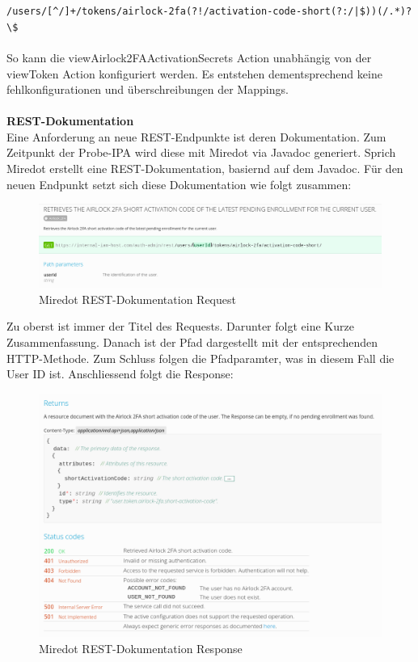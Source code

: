 \noindent \verb @/users/[^/]+/tokens/airlock-2fa(?!/activation-code-short(?:/|$))(/.*)?\$ @\\\\
So kann die viewAirlock2FAActivationSecrets Action unabhängig von der viewToken Action konfiguriert werden. Es entstehen dementsprechend keine fehlkonfigurationen und überschreibungen der Mappings.\\
\\
\textbf{REST-Dokumentation}\\
Eine Anforderung an neue REST-Endpunkte ist deren Dokumentation. Zum Zeitpunkt der Probe-IPA wird diese mit Miredot via Javadoc generiert. Sprich Miredot erstellt eine REST-Dokumentation, basiernd auf dem Javadoc. Für den neuen Endpunkt setzt sich diese Dokumentation wie folgt zusammen:
\begin{figure}[H]
	\begin{center}
		\includegraphics[width=1.0\textwidth]{ressourcen/requestdoc}
		\caption[REST-Dokumentation Request]{Miredot REST-Dokumentation Request}\label{fig:requestdoc}
	\end{center}
\end{figure}
\noindent Zu oberst ist immer der Titel des Requests. Darunter folgt eine Kurze Zusammenfassung. Danach ist der Pfad dargestellt mit der entsprechenden HTTP-Methode.
Zum Schluss folgen die Pfadparamter, was in diesem Fall die User ID ist.
Anschliessend folgt die Response:

\begin{figure}[H]
	\begin{center}
		\includegraphics[width=1.0\textwidth]{ressourcen/responsedoc}
		\caption[REST-Dokumentation Response]{Miredot REST-Dokumentation Response}\label{fig:responsedoc}
	\end{center}
\end{figure}

